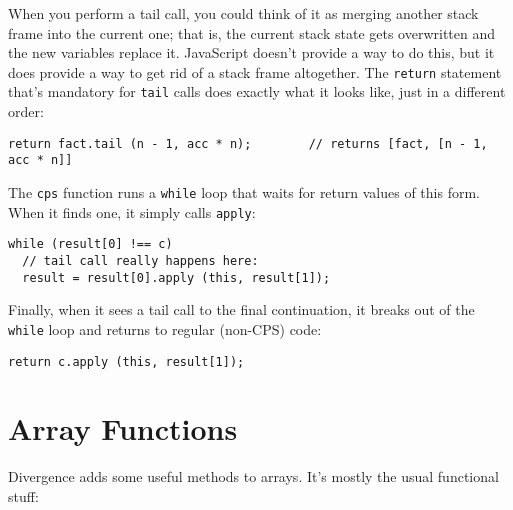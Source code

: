 \documentclass{report}
\begin{document}
      When you perform a tail call, you could think of it as merging another stack frame into the current one; that is, the current stack state gets overwritten and the new variables replace
      it. JavaScript doesn't provide a way to do this, but it does provide a way to get rid of a stack frame altogether. The \verb|return| statement that's mandatory for \verb|tail| calls does
      exactly what it looks like, just in a different order:

\begin{verbatim}
return fact.tail (n - 1, acc * n);        // returns [fact, [n - 1, acc * n]]
\end{verbatim}

      The \verb|cps| function runs a \verb|while| loop that waits for return values of this form. When it finds one, it simply calls \verb|apply|:

\begin{verbatim}
while (result[0] !== c)
  // tail call really happens here:
  result = result[0].apply (this, result[1]);
\end{verbatim}

      Finally, when it sees a tail call to the final continuation, it breaks out of the \verb|while| loop and returns to regular (non-CPS) code:

\begin{verbatim}
return c.apply (this, result[1]);
\end{verbatim}

\chapter {Array Functions}
    \label{sec:array-functions}
    Divergence adds some useful methods to arrays. It's mostly the usual functional stuff:
\end{document}
